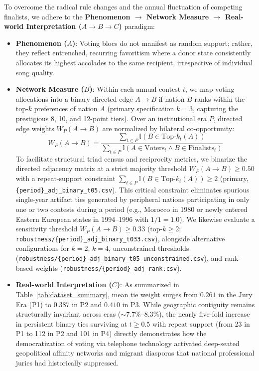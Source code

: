 

To overcome the radical rule changes and the annual fluctuation of competing finalists, we adhere to the \textbf{Phenomenon $\to$ Network Measure $\to$ Real-world Interpretation ($A \to B \to C$)} paradigm:
\begin{itemize}
    \item \textbf{Phenomenon ($A$)}: Voting blocs do not manifest as random support; rather, they reflect entrenched, recurring favoritism where a donor state consistently allocates its highest accolades to the same recipient, irrespective of individual song quality.
    \item \textbf{Network Measure ($B$)}: Within each annual contest $t$, we map voting allocations into a binary directed edge $A \to B$ if nation $B$ ranks within the top-$k$ preferences of nation $A$ (primary specification $k=3$, capturing the prestigious 8, 10, and 12-point tiers). Over an institutional era $P$, directed edge weights $W_P(A \to B)$ are normalized by bilateral co-opportunity:
    \begin{equation}
        W_P(A \to B) = \frac{\sum_{t \in P} \mathbb{I}(B \in \text{Top-}k_t(A))}{\sum_{t \in P} \mathbb{I}(A \in \text{Voters}_t \land B \in \text{Finalists}_t)}
    \end{equation}
    To facilitate structural triad census and reciprocity metrics, we binarize the directed adjacency matrix at a strict majority threshold $W_P(A \to B) \ge 0.50$ with a repeat-support constraint $\sum_{t \in P} \mathbb{I}(B \in \text{Top-}k_t(A)) \ge 2$ (primary, \texttt{\{period\}\_adj\_binary\_t05.csv}). This critical constraint eliminates spurious single-year artifact ties generated by peripheral nations participating in only one or two contests during a period (e.g., Morocco in 1980 or newly entered Eastern European states in 1994--1996 with $1/1 = 1.0$). We likewise evaluate a sensitivity threshold $W_P(A \to B) \ge 0.33$ ($\text{top-}k \ge 2$; \texttt{robustness/\{period\}\_adj\_binary\_t033.csv}), alongside alternative configurations for $k=2$, $k=4$, unconstrained thresholds (\texttt{robustness/\{period\}\_adj_binary_t05_unconstrained.csv}), and rank-based weights (\texttt{robustness/\{period\}\_adj_rank.csv}).
    \item \textbf{Real-world Interpretation ($C$)}: As summarized in Table~\ref{tab:dataset_summary}, mean tie weight surges from $0.261$ in the Jury Era (P1) to $0.387$ in P2 and $0.410$ in P3. While geographic contiguity remains structurally invariant across eras ($\sim 7.7\%$--$8.3\%$), the nearly five-fold increase in persistent binary ties surviving at $t \ge 0.5$ with repeat support (from 23 in P1 to 112 in P2 and 101 in P4) directly demonstrates how the democratization of voting via telephone technology activated deep-seated geopolitical affinity networks and migrant diasporas that national professional juries had historically suppressed.
\end{itemize}
